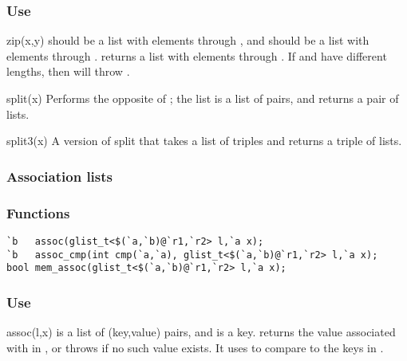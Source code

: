 \subsubsection*{Use}

\begin{defun}{zip}{(x,y)}
 should be a list with elements  through , and
 should be a list with elements  through .
 returns a list with elements 
through .  If  and  have
different lengths, then  will throw
.
\end{defun}

\begin{defun}{split}{(x)}
Performs the opposite of ; the list  is a list of
pairs, and  returns a pair of lists.
\end{defun}

\begin{defun}{split3}{(x)}
A version of split that takes a list of triples and returns a triple
of lists.
\end{defun}


\subsubsection*{Association lists}
\subsubsection*{Functions}
\begin{verbatim}
`b   assoc(glist_t<$(`a,`b)@`r1,`r2> l,`a x);
`b   assoc_cmp(int cmp(`a,`a), glist_t<$(`a,`b)@`r1,`r2> l,`a x);
bool mem_assoc(glist_t<$(`a,`b)@`r1,`r2> l,`a x);
\end{verbatim} %

\subsubsection*{Use}

\begin{defun}{assoc}{(l,x)}
 is a list of (key,value) pairs, and  is a key.
 returns the value associated with  in , or
throws  if no such value exists.  It uses
\code{==} to compare  to the keys in .
\end{defun}


